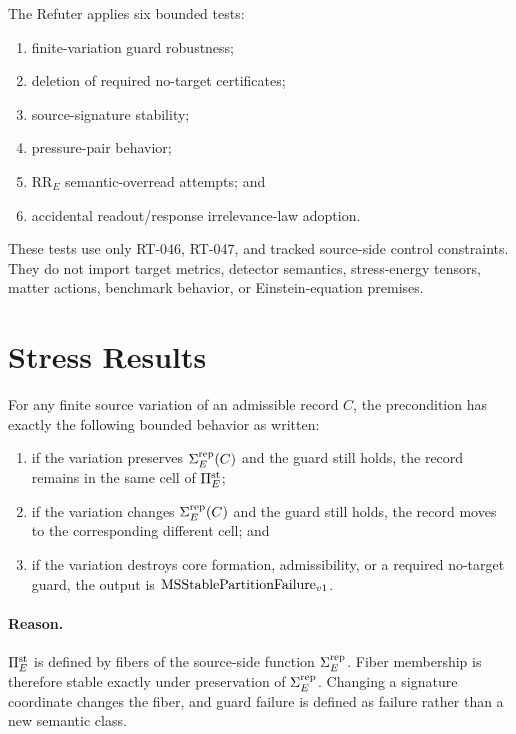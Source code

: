 The Refuter applies six bounded tests:
\begin{enumerate}
  \item finite-variation guard robustness;
  \item deletion of required no-target certificates;
  \item source-signature stability;
  \item pressure-pair behavior;
  \item \(\mathrm{RR}_E\) semantic-overread attempts; and
  \item accidental readout/response irrelevance-law adoption.
\end{enumerate}
These tests use only RT-046, RT-047, and tracked source-side control
constraints. They do not import target metrics, detector semantics,
stress-energy tensors, matter actions, benchmark behavior, or
Einstein-equation premises.

\section{Stress Results}

\begin{proposition}
For any finite source variation of an admissible record \(C\), the
precondition has exactly the following bounded behavior as written:
\begin{enumerate}
  \item if the variation preserves \(\Sigma^{\mathrm{rep}}_E(C)\) and the guard still holds,
    the record remains in the same cell of \(\Pi^{\mathrm{st}}_E\);
  \item if the variation changes \(\Sigma^{\mathrm{rep}}_E(C)\) and the guard still holds, the
    record moves to the corresponding different cell; and
  \item if the variation destroys core formation, admissibility, or a
    required no-target guard, the output is \(\mathrm{MSStablePartitionFailure}_{v1}\).
\end{enumerate}
\end{proposition}

\paragraph{Reason.}
\(\Pi^{\mathrm{st}}_E\) is defined by fibers of the source-side function \(\Sigma^{\mathrm{rep}}_E\).
Fiber membership is therefore stable exactly under preservation of
\(\Sigma^{\mathrm{rep}}_E\). Changing a signature coordinate changes the fiber, and guard
failure is defined as failure rather than a new semantic class.

